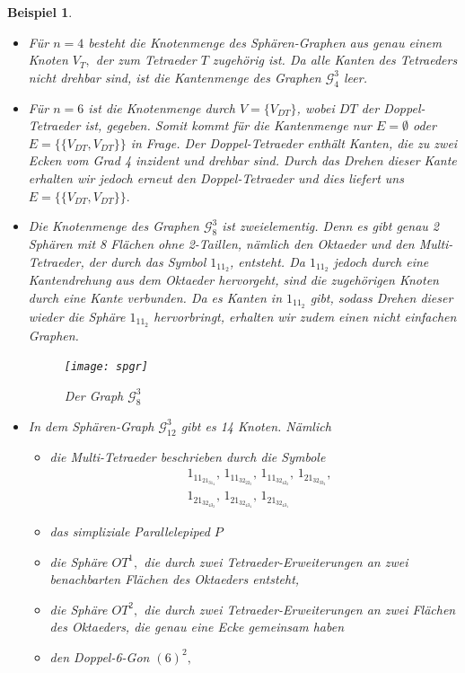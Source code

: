 \documentclass[12pt,titlepage,twoside,cleardoublepage]{article}
\theoremstyle{nummermitklammern}
\newtheorem{bsp}[temp]{Beispiel}
\newtheorem{bsp}[zahl]{Beispiel}
\numberwithin{equation}{section}
\begin{document}
 \begin{bsp}
 \begin{itemize}
 \item Für $n=4$ besteht die Knotenmenge des Sphären-Graphen aus genau einem Knoten $V_T,$ der zum Tetraeder $T$ zugehörig ist. Da alle Kanten des Tetraeders nicht drehbar sind, ist die Kantenmenge des Graphen $\mathcal{G}_4^3$ leer. 
 \item Für $n=6$ ist die Knotenmenge durch $V=\{V_{DT}\}$, wobei $DT$ der Doppel-Tetraeder ist, gegeben. Somit kommt für die Kantenmenge nur $E=\emptyset$ oder $E=\{\{V_{DT},V_{DT}\}\}$ in Frage. Der Doppel-Tetraeder enthält Kanten, die zu zwei Ecken vom Grad 4 inzident und drehbar sind. Durch das Drehen dieser Kante erhalten wir jedoch erneut den Doppel-Tetraeder und dies liefert uns $E=\{\{V_{DT},V_{DT}\}\}.$ 
 \item Die Knotenmenge des Graphen $\mathcal{G}^3_8$ ist zweielementig. Denn es gibt genau 2 Sphären mit 8 Flächen ohne 2-Taillen, nämlich den Oktaeder und den Multi-Tetraeder, der durch das Symbol $1_11_2$, entsteht.
 Da $1_11_2$ jedoch durch eine Kantendrehung aus dem Oktaeder hervorgeht, sind die zugehörigen Knoten durch eine Kante verbunden. Da es Kanten in $1_11_2$ gibt, sodass Drehen dieser wieder die Sphäre $1_11_2$ hervorbringt, erhalten wir zudem einen nicht einfachen Graphen.
 \begin{figure}[H]
\begin{center}
\texttt{[image: spgr]}
\end{center}
\caption{Der Graph $\mathcal{G}_8^3$}
\end{figure}
 \item In dem Sphären-Graph $\mathcal{G}_{12}^3$ gibt es 14 Knoten. Nämlich 
 \begin{itemize}
 \item die Multi-Tetraeder beschrieben durch die Symbole \begin{align*}
&1_11_21_31_4,\,1_11_32_22_3,\,1_11_32_42_2,\,1_21_32_33_2,\\
&1_21_32_43_2,\,1_21_32_43_4,\,1_21_32_43_1
\end{align*}
\item das simpliziale Parallelepiped $P$
 \item die Sphäre $OT^1,$ die durch zwei Tetraeder-Erweiterungen an zwei benachbarten Flächen des Oktaeders entsteht,
 \item die Sphäre $OT^2,$ die durch zwei Tetraeder-Erweiterungen an zwei Flächen des Oktaeders, die genau eine Ecke gemeinsam haben
 \item den Doppel-6-Gon $(6)^2,$

\end{itemize}
\end{itemize}
\end{bsp}
\end{document}
